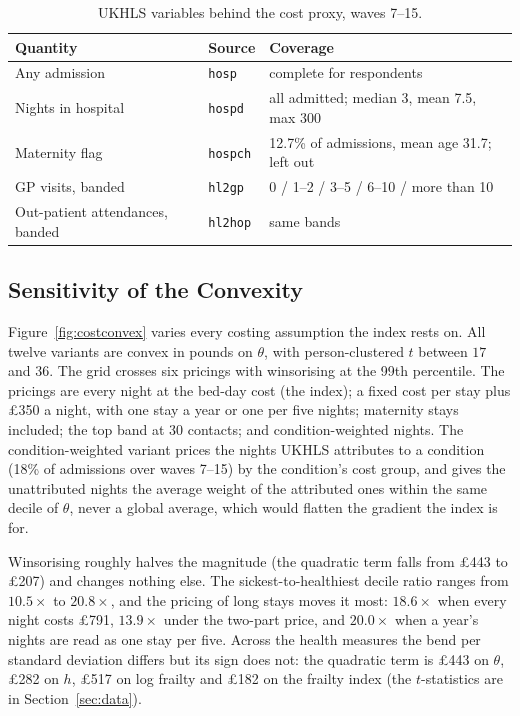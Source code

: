 \documentclass[11pt]{article}
\newcommand{\code}[1]{\texttt{\small #1}}
\begin{document}
	\begin{table}[H]\centering\small
		\caption{UKHLS variables behind the cost proxy, waves 7--15.}
		\label{tab:costvars}
		\begin{tabular}{llp{6.4cm}}
			\toprule
			Quantity & Source & Coverage \\
			\midrule
			Any admission & \code{hosp} & complete for respondents \\
			Nights in hospital & \code{hospd} & all admitted; median 3, mean 7.5, max 300 \\
			Maternity flag & \code{hospch} & 12.7\% of admissions, mean age 31.7; left out \\
			GP visits, banded & \code{hl2gp} & 0 / 1--2 / 3--5 / 6--10 / more than 10 \\
			Out-patient attendances, banded & \code{hl2hop} & same bands \\
			\bottomrule
		\end{tabular}
	\end{table}

	\subsection{Sensitivity of the Convexity}

	Figure~\ref{fig:costconvex} varies every costing assumption the index rests on. All twelve variants are convex in pounds on $\theta$, with person-clustered $t$ between $17$ and $36$. The grid crosses six pricings with winsorising at the 99th percentile. The pricings are every night at the bed-day cost (the index); a fixed cost per stay plus \pounds350 a night, with one stay a year or one per five nights; maternity stays included; the top band at 30 contacts; and condition-weighted nights. The condition-weighted variant prices the nights UKHLS attributes to a condition (18\% of admissions over waves 7--15) by the condition's cost group, and gives the unattributed nights the average weight of the attributed ones within the same decile of $\theta$, never a global average, which would flatten the gradient the index is for.

	Winsorising roughly halves the magnitude (the quadratic term falls from \pounds443 to \pounds207) and changes nothing else. The sickest-to-healthiest decile ratio ranges from $10.5\times$ to $20.8\times$, and the pricing of long stays moves it most: $18.6\times$ when every night costs \pounds791, $13.9\times$ under the two-part price, and $20.0\times$ when a year's nights are read as one stay per five. Across the health measures the bend per standard deviation differs but its sign does not: the quadratic term is \pounds443 on $\theta$, \pounds282 on $h$, \pounds517 on log frailty and \pounds182 on the frailty index (the $t$-statistics are in Section~\ref{sec:data}).
\end{document}
